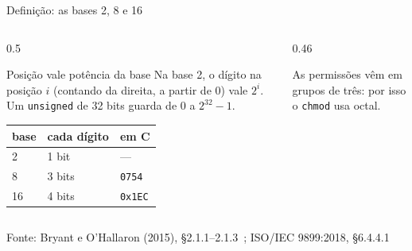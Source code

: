 \documentclass[aspectratio=169]{beamer}
\newcommand{\bits}[3]{%
  \foreach \b [count=\k from 0] in {#3} {
    \node[bit\b] at (#1+0.42*\k, #2) {\b};
  }
}
\newcommand{\fonte}[1]{\vfill\hfill{\scriptsize\textcolor{UFSGray}{Fonte: #1}}}
\begin{document}
\begin{frame}{Definição: as bases 2, 8 e 16}
  \begin{columns}[c]
    \begin{column}{0.5\textwidth}
      \begin{block}{Posição vale potência da base}
        \small Na base 2, o dígito na posição $i$ (contando da direita, a
        partir de 0) vale $2^i$. Um \texttt{unsigned} de 32 bits guarda de
        $0$ a $2^{32}-1$.
      \end{block}
      \small
      \begin{tabular}{@{}lll@{}}
        \toprule
        base & cada dígito & em C \\
        \midrule
        2  & 1 bit  & --- \\
        8  & 3 bits & \texttt{0754} \\
        16 & 4 bits & \texttt{0x1EC} \\
        \bottomrule
      \end{tabular}
    \end{column}
    \begin{column}{0.46\textwidth}
      \begin{center}
      \end{center}
      \small As permissões vêm em grupos de três: por isso o \texttt{chmod}
      usa octal.
    \end{column}
  \end{columns}
  \fonte{Bryant e O'Hallaron (2015), §2.1.1--2.1.3~\cite{bryant2015computer};
    ISO/IEC 9899:2018, §6.4.4.1~\cite{iso2018c17}}
\end{frame}
\end{document}
